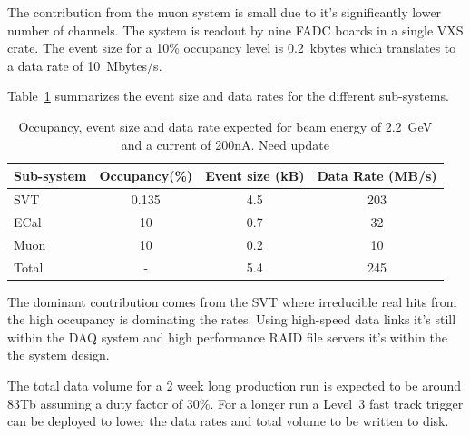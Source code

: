 The contribution from the muon system is small due to it's significantly lower number of channels. The system is readout by nine FADC boards in a single VXS crate. The event 
size for a 10\% occupancy level is 0.2~kbytes which translates to a data rate of 10~Mbytes/s. 

Table~\ref{tab:data_rates} summarizes the event size and data rates for the different 
sub-systems. 
\begin{table}[]
\centering
\begin{tabular}{l|c|c|c}
Sub-system & Occupancy(\%) & Event size (kB) & Data Rate (MB/s) \\
\hline
SVT & 0.135 & 4.5 & 203 \\
ECal & 10 & 0.7 & 32 \\
Muon & 10 & 0.2 & 10 \\
\hline
Total & - & 5.4 & 245 \\
\hline
\end{tabular}
\caption{{\small Occupancy, event size and data rate expected for beam energy of 2.2~GeV and a current of 200nA.} {\color{red}Need update}}
\label{tab:data_rates}
\end{table}
The dominant contribution comes from the SVT where irreducible real hits from the high occupancy is dominating the rates. Using high-speed data links it's still within the DAQ system and high performance RAID file servers it's within the the system design. 

The total data volume for a 2 week long production run is expected to be around 83Tb 
assuming a duty factor of 30\%.  For a longer run a Level~3 fast track trigger can 
be deployed to lower the data rates and total volume to be written to disk. 
